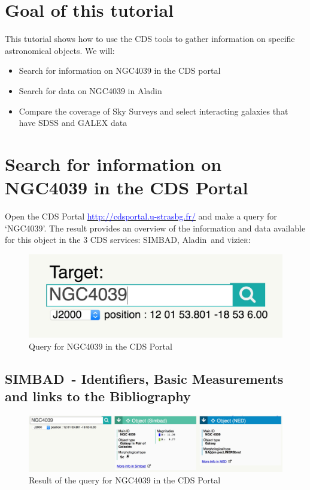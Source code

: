\documentclass [a4paper, 12pt]{article}
\newcommand{\aladin}{{\textsc{A}{ladin}}}
\newcommand{\simbad}{{\textsc{SIMBAD}}}
\newcommand{\vizier}{{\textsc{v}izie\textsc{r}}}
\begin{document}
\section{Goal of this tutorial}

This tutorial shows how to use the CDS tools to gather information on 
specific astronomical objects. We will:
\begin{itemize}
\item Search for information on NGC4039 in the CDS portal
\item Search for data on NGC4039 in \aladin\
\item Compare the coverage of Sky Surveys and select interacting 
galaxies that have SDSS and GALEX data
\end{itemize}

\section{Search for information on NGC4039 in the CDS Portal}

Open the CDS Portal 
\hyperref[http://cdsportal.u-strasbg.fr/]{\textcolor{blue}{http://cdsportal.u-strasbg.fr/}}
and make a query for `NGC4039'.
The result provides an overview of the information and data available for 
this object in the 3 CDS services: \simbad, \aladin\ and \vizier: 

\begin{figure}[H]
\center
\includegraphics[width=0.5  \textwidth]{../images/cdsportal_search_ngc4039.jpg}
\caption{Query for NGC4039 in the CDS Portal}
\label{fig:cdsportal1}
\end{figure}

\subsection{\simbad\ - Identifiers, Basic Measurements and links to the 
Bibliography}

\begin{figure}[H]
    \center
    \includegraphics[width=1  
    \textwidth]{../images/cdsportal_object-information_ngc4039.jpg}
    \caption{Result of the query for NGC4039 in the CDS Portal}
    \label{fig:cdsportal2}
\end{figure}
\end{document}
